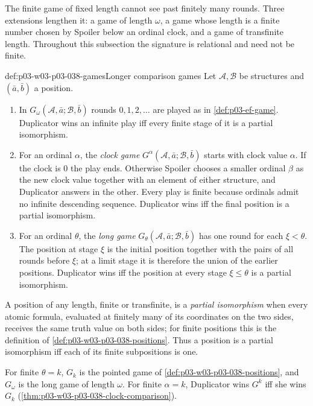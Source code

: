The finite game of fixed length cannot see past finitely many rounds.
Three extensions lengthen it: a game of length
\(\omega\), a game whose length is a finite number chosen by Spoiler below
an ordinal clock, and a game of transfinite length. Throughout this
subsection the signature is relational and need not be finite.

\begin{hbdefinition}{def:p03-w03-p03-038-games}{Longer comparison games}
Let \(\mathcal A,\mathcal B\) be structures and \((\bar a,\bar b)\) a
position.
\begin{enumerate}
\item In \(G_\omega(\mathcal A,\bar a;\mathcal B,\bar b)\) rounds
      \(0,1,2,\ldots\) are played as in \cref{def:p03-ef-game}. Duplicator
      wins an infinite play iff every finite stage of it is a partial
      isomorphism.
\item For an ordinal \(\alpha\), the \emph{clock game}
      \(G^\alpha(\mathcal A,\bar a;\mathcal B,\bar b)\) starts with clock
      value \(\alpha\). If the clock is \(0\) the play ends. Otherwise
      Spoiler chooses a smaller ordinal \(\beta\) as the new clock value
      together with an element of either structure, and Duplicator answers
      in the other. Every play is finite because ordinals admit no infinite
      descending sequence. Duplicator wins iff the final position is a
      partial isomorphism.
\item For an ordinal \(\theta\), the \emph{long game}
      \(G_\theta(\mathcal A,\bar a;\mathcal B,\bar b)\) has one round for
      each \(\xi<\theta\). The position at stage \(\xi\) is the initial
      position together with the pairs of all rounds before \(\xi\); at a
      limit stage it is therefore the union of the earlier positions.
      Duplicator wins iff the position at every stage
      \(\xi\le\theta\) is a partial isomorphism.
\end{enumerate}
A position of any length, finite or transfinite, is a \emph{partial
isomorphism} when every atomic formula, evaluated at finitely many of its
coordinates on the two sides, receives the same truth value on both sides;
for finite positions this is the definition of
\cref{def:p03-w03-p03-038-positions}. Thus a position is a partial
isomorphism iff each of its finite subpositions is one.
\end{hbdefinition}

For finite \(\theta=k\), \(G_k\) is the pointed game of
\cref{def:p03-w03-p03-038-positions}, and \(G_\omega\) is the long game of
length \(\omega\). For finite \(\alpha=k\), Duplicator wins \(G^k\) iff she
wins \(G_k\) (\cref{thm:p03-w03-p03-038-clock-comparison}).


